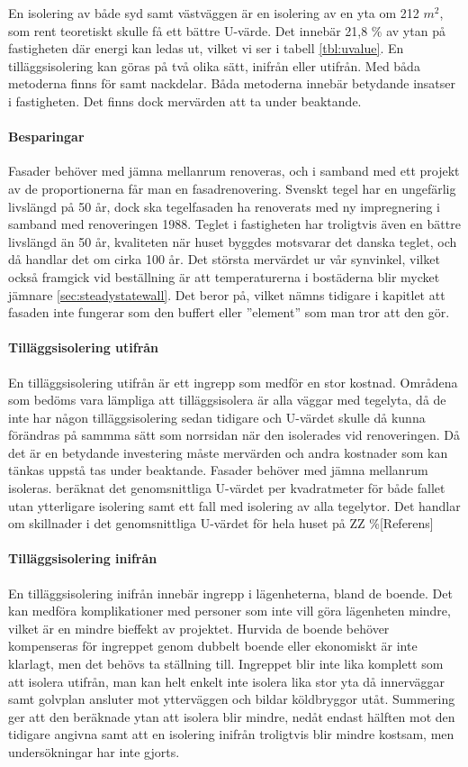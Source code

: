 En isolering av både syd samt västväggen är en isolering av en yta om 212 $\unit{m^2}$, som rent teoretiskt skulle få ett bättre U-värde. Det innebär 21,8 \% av ytan på fastigheten där energi kan ledas ut, vilket vi ser i tabell \ref{tbl:uvalue}.
En tilläggsisolering kan göras på två olika sätt, inifrån eller utifrån. Med båda metoderna finns för samt nackdelar. Båda metoderna innebär betydande insatser i fastigheten. Det finns dock mervärden att ta under beaktande. 

\paragraph{Besparingar}
Fasader behöver med jämna mellanrum renoveras, och i samband med ett projekt av de proportionerna får man en fasadrenovering. Svenskt tegel har en ungefärlig livslängd på 50 år\cite{magnus}, dock ska tegelfasaden ha renoverats med ny impregnering i samband med renoveringen 1988. Teglet i fastigheten har troligtvis även en bättre livslängd än 50 år, kvaliteten när huset byggdes motsvarar det danska teglet, och då handlar det om cirka 100 år. Det största mervärdet ur vår synvinkel, vilket också framgick vid beställning är att temperaturerna i bostäderna blir mycket jämnare \ref{sec:steadystatewall}. Det beror på, vilket nämns tidigare i kapitlet att fasaden inte fungerar som den buffert eller ”element” som man tror att den gör.

\paragraph{Tilläggsisolering utifrån}
En tilläggsisolering utifrån är ett ingrepp som medför en stor kostnad. Områdena som bedöms vara lämpliga att tilläggsisolera är alla väggar med tegelyta, då de inte har någon tilläggsisolering sedan tidigare och U-värdet skulle då kunna förändras på sammma sätt som norrsidan när den isolerades vid renoveringen. Då det är en betydande investering måste mervärden och andra kostnader som kan tänkas uppstå tas under beaktande. Fasader behöver med jämna mellanrum isoleras. beräknat det genomsnittliga U-värdet per kvadratmeter för både fallet utan ytterligare isolering samt ett fall med isolering av alla tegelytor. Det handlar om skillnader i det genomsnittliga U-värdet för hela huset på ZZ \%[Referens]

\paragraph{Tilläggsisolering inifrån}
En tilläggsisolering inifrån innebär ingrepp i lägenheterna, bland de boende. Det kan medföra komplikationer med personer som inte vill göra lägenheten mindre, vilket är en mindre bieffekt av projektet. Hurvida de boende behöver kompenseras för ingreppet genom dubbelt boende eller ekonomiskt är inte klarlagt, men det behövs ta ställning till. Ingreppet blir inte lika komplett som att isolera utifrån, man kan helt enkelt inte isolera lika stor yta då innerväggar samt golvplan ansluter mot ytterväggen och bildar köldbryggor utåt. Summering ger att den beräknade ytan att isolera blir mindre, nedåt endast hälften mot den tidigare angivna samt att en isolering inifrån troligtvis blir mindre kostsam, men undersökningar har inte gjorts.

